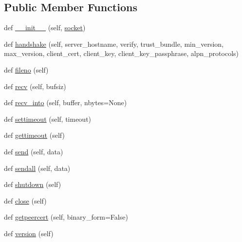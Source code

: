 \subsection*{Public Member Functions}
\begin{DoxyCompactItemize}
\item 
def \hyperlink{classpip_1_1__vendor_1_1urllib3_1_1contrib_1_1securetransport_1_1WrappedSocket_ade08d00a9773eda7ed4a3c47fe315a33}{\+\_\+\+\_\+init\+\_\+\+\_\+} (self, \hyperlink{classpip_1_1__vendor_1_1urllib3_1_1contrib_1_1securetransport_1_1WrappedSocket_a96b68596ff2c3a48383878791990c8b0}{socket})
\item 
def \hyperlink{classpip_1_1__vendor_1_1urllib3_1_1contrib_1_1securetransport_1_1WrappedSocket_a4dff747225797a2242238d7e073fa79b}{handshake} (self, server\+\_\+hostname, verify, trust\+\_\+bundle, min\+\_\+version, max\+\_\+version, client\+\_\+cert, client\+\_\+key, client\+\_\+key\+\_\+passphrase, alpn\+\_\+protocols)
\item 
def \hyperlink{classpip_1_1__vendor_1_1urllib3_1_1contrib_1_1securetransport_1_1WrappedSocket_a31e87c7b2b28091a7ed8e9553e1a8887}{fileno} (self)
\item 
def \hyperlink{classpip_1_1__vendor_1_1urllib3_1_1contrib_1_1securetransport_1_1WrappedSocket_a3832e7a008b3a38b6b9abc8941f7e062}{recv} (self, bufsiz)
\item 
def \hyperlink{classpip_1_1__vendor_1_1urllib3_1_1contrib_1_1securetransport_1_1WrappedSocket_ab0ca1914c71fa5334fe5793cb636adb1}{recv\+\_\+into} (self, buffer, nbytes=None)
\item 
def \hyperlink{classpip_1_1__vendor_1_1urllib3_1_1contrib_1_1securetransport_1_1WrappedSocket_a0e34ce090b823e29a6c111b45569a678}{settimeout} (self, timeout)
\item 
def \hyperlink{classpip_1_1__vendor_1_1urllib3_1_1contrib_1_1securetransport_1_1WrappedSocket_a13fa475afce06314bf85d8287bc96107}{gettimeout} (self)
\item 
def \hyperlink{classpip_1_1__vendor_1_1urllib3_1_1contrib_1_1securetransport_1_1WrappedSocket_a28869d3bbbcd6d0517f106a7192642f5}{send} (self, data)
\item 
def \hyperlink{classpip_1_1__vendor_1_1urllib3_1_1contrib_1_1securetransport_1_1WrappedSocket_ab9e8aadb499f4166567dbdb815e44f9f}{sendall} (self, data)
\item 
def \hyperlink{classpip_1_1__vendor_1_1urllib3_1_1contrib_1_1securetransport_1_1WrappedSocket_ab66073871c2338ba89e2de6994f72ce6}{shutdown} (self)
\item 
def \hyperlink{classpip_1_1__vendor_1_1urllib3_1_1contrib_1_1securetransport_1_1WrappedSocket_a062c0757a136ebcb6a25665f01bf15e6}{close} (self)
\item 
def \hyperlink{classpip_1_1__vendor_1_1urllib3_1_1contrib_1_1securetransport_1_1WrappedSocket_a2fcc312d9af3b08f703b6578b3a7ac06}{getpeercert} (self, binary\+\_\+form=False)
\item 
def \hyperlink{classpip_1_1__vendor_1_1urllib3_1_1contrib_1_1securetransport_1_1WrappedSocket_af0d3f6b340221cc6e658dab4137b8391}{version} (self)
\end{DoxyCompactItemize}
